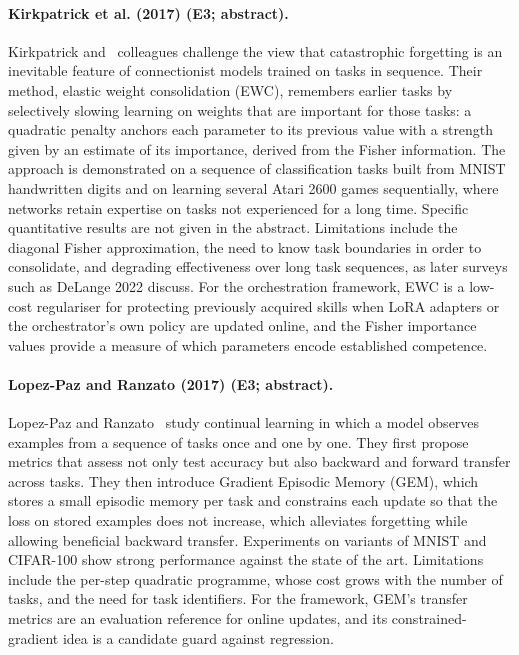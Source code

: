 \documentclass[10pt,a4paper]{article}
\begin{document}
\paragraph{Kirkpatrick et al. (2017) (E3; abstract).} Kirkpatrick and~\cite{Kirkpatrick2017} colleagues challenge the view that catastrophic forgetting is an inevitable feature of connectionist models trained on tasks in sequence. Their method, elastic weight consolidation (EWC), remembers earlier tasks by selectively slowing learning on weights that are important for those tasks: a quadratic penalty anchors each parameter to its previous value with a strength given by an estimate of its importance, derived from the Fisher information. The approach is demonstrated on a sequence of classification tasks built from MNIST handwritten digits and on learning several Atari 2600 games sequentially, where networks retain expertise on tasks not experienced for a long time. Specific quantitative results are not given in the abstract. Limitations include the diagonal Fisher approximation, the need to know task boundaries in order to consolidate, and degrading effectiveness over long task sequences, as later surveys such as DeLange 2022 discuss. For the orchestration framework, EWC is a low-cost regulariser for protecting previously acquired skills when LoRA adapters or the orchestrator's own policy are updated online, and the Fisher importance values provide a measure of which parameters encode established competence.

\paragraph{Lopez-Paz and Ranzato (2017) (E3; abstract).} Lopez-Paz and Ranzato~\cite{LopezPaz2017} study continual learning in which a model observes examples from a sequence of tasks once and one by one. They first propose metrics that assess not only test accuracy but also backward and forward transfer across tasks. They then introduce Gradient Episodic Memory (GEM), which stores a small episodic memory per task and constrains each update so that the loss on stored examples does not increase, which alleviates forgetting while allowing beneficial backward transfer. Experiments on variants of MNIST and CIFAR-100 show strong performance against the state of the art. Limitations include the per-step quadratic programme, whose cost grows with the number of tasks, and the need for task identifiers. For the framework, GEM's transfer metrics are an evaluation reference for online updates, and its constrained-gradient idea is a candidate guard against regression.
\end{document}
